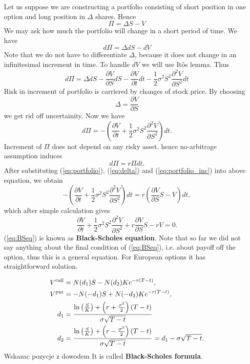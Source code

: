 \documentclass[a4paper,12pt, twoside]{book}
\theoremstyle{definition}
\theoremstyle{remark}
\begin{document}
Let us suppose we are constructing a portfolio consisting of short position in one option and long position in $\Delta$ shares. Hence
\begin{equation}
 \label{eq:portfolio}
  \Pi = \Delta S - V 
\end{equation}
We may ask how much the portfolio will change in a short period of time. We have
\[ d\Pi = \Delta dS - dV  \]
Note that we do not have to differentiate $\Delta$, because it does not change in an infinitesimal increment in time. To handle $dV$ we will use It\^{o}s lemma. Thus
\[ d\Pi = \Delta dS - \frac{\partial V}{\partial S}dS - \frac{\partial V}{\partial t}dt - \frac{1}{2}\sigma^2 S^2 \frac{\partial^2 V}{\partial S^2}dt  \]
Risk in increment of portfolio is carriered by changes of stock price. By choosing
\begin{equation}
 \label{eq:delta}
 \Delta = \frac{\partial V}{\partial S}
\end{equation}
we get rid off uncertainity. Now we have
\begin{equation}
  \label{eq:portfolio_inc}
 d\Pi = -(\frac{\partial V}{\partial t} + \frac{1}{2}\sigma^2 S^2 \frac{\partial^2 V}{\partial S^2})dt.
\end{equation}
Increment of $\Pi$ does not depend on any risky asset, hence no-arbitrage assumption induces
\[ d\Pi = r\Pi dt. \]
After substituting (\ref{eq:portfolio}), (\ref{eq:delta}) and (\ref{eq:portfolio_inc}) into above equation, we obtain
\[ -(\frac{\partial V}{\partial t} + \frac{1}{2}\sigma^2 S^2 \frac{\partial^2 V}{\partial S^2})dt = r(\frac{\partial V}{\partial S} S - V)dt, \]
which after simple calculation gives
\begin{equation}
 \label{eq:BSeq}
 \frac{\partial V}{\partial t} + \frac{1}{2}\sigma^2 S^2 \frac{\partial^2 V}{\partial S^2} + r\frac{\partial V}{\partial S} S - rV = 0.
\end{equation}
(\ref{eq:BSeq}) is known as \textbf{Black-Scholes equation}. Note that so far we did not say anything about the final condition of (\ref{eq:BSeq}), i.e. about payoff off the option, thus this is a general equation. For European options it has straightforward solution.

\begin{align*}
V\textsuperscript{call} &= N(d_1)S  - N(d_2)K e^{-r(T-t)},\\
V\textsuperscript{put} &= -N(-d_1)S + N(-d_2)K e^{-r(T-t)},\\
d_1 &= \frac{\ln\left(\frac{S}{K}\right)+\left(r+\frac{\sigma^{2}}{2}\right)(T-t)}{\sigma\sqrt{T-t}}\\
d_2 &= \frac{\ln\left(\frac{S}{K}\right)+\left(r-\frac{\sigma^{2}}{2}\right)(T-t)}{\sigma\sqrt{T-t}} = d_{1}-\sigma\sqrt{T-t}.
\end{align*}
{\Large \color{red} Wskazac pozycje z dowodem}
It is called \textbf{Black-Scholes formula}.
\end{document}
